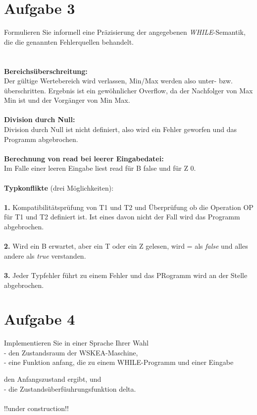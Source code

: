\documentclass[ngerman,a4paper]{report}
\begin{document}
\section*{Aufgabe 3}
Formulieren Sie informell eine Präzisierung der angegebenen \emph{WHILE}-Semantik, die die genannten Fehlerquellen behandelt.\\\\\\
\textbf{Bereichsüberschreitung:}\\
Der gültige Wertebereich wird verlassen, Min/Max werden also unter- bzw. überschritten. Ergebnis ist ein gewöhnlicher Overflow, da der Nachfolger von Max Min ist und der Vorgänger von Min Max.\\\\
\textbf{Division durch Null:}\\
Division durch Null ist nicht definiert, also wird ein Fehler geworfen und das Programm abgebrochen.\\\\
\textbf{Berechnung von read bei leerer Eingabedatei:}\\
Im Falle einer leeren Eingabe liest read für B false und für Z 0.\\\\
\textbf{Typkonflikte} (drei Möglichkeiten):\\\\
\textbf{1.}
Kompatibilitätsprüfung von T1 und T2 und Überprüfung ob die Operation OP für T1 und T2 definiert ist. Ist eines davon nicht der Fall wird das Programm abgebrochen.\\\\
\textbf{2.}
Wird ein B erwartet, aber ein T oder ein Z gelesen, wird = als \textit{false} und alles andere als \textit{true} verstanden.\\\\
\textbf{3.} Jeder Typfehler führt zu einem Fehler und das PRogramm wird an der Stelle abgebrochen.

\section*{Aufgabe 4}
Implementieren Sie in einer Sprache Ihrer Wahl\\

- den Zustandsraum der WSKEA-Maschine,\\

- eine Funktion anfang, die zu einem WHILE-Programm und einer Eingabe

den Anfangszustand ergibt, und\\

- die Zustandsüberfüuhrungsfunktion delta.\\\\
!!under construction!!
\end{document}
